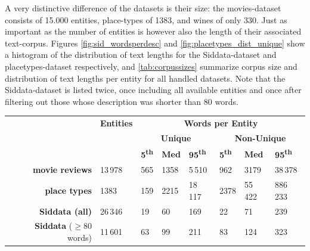 A very distinctive difference of the datasets is their size: the movies-dataset consists of 15.000 entities, place-types of 1383, and wines of only 330. Just as important as the number of entities is however also the length of their associated text-corpus. Figures \ref{fig:sid_wordsperdesc} and \ref{fig:placetypes_dist_unique} show a histogram of the distribution of text lengths for the Siddata-dataset and placetypes-dataset respectively, and \autoref{tab:corpussizes} summarize corpus size and distribution of text lengths per entity for all handled datasets. Note that the Siddata-dataset is listed twice, once including all available entities and once after filtering out those whose description was shorter than 80 words.

\begin{table}[H]
	\centering
	\begin{tabular}{r|l|lll|lll}
		&  \textbf{Entities}   & \multicolumn{6}{c}{\textbf{Words per Entity}}                                 \\
		&       & \multicolumn{3}{c}{\textbf{Unique}} & \multicolumn{3}{c}{\textbf{Non-Unique}} \\
	 &  & \textbf{5\textsuperscript{th}} & \textbf{Med} & \textbf{95\textsuperscript{th}} & \textbf{5\textsuperscript{th}} & \textbf{Med} & \textbf{95\textsuperscript{th}} \\ \midrule
	\textbf{movie reviews}             & 13\,978 & 565    & 1358 & 5\,510  & 962   & 3179    & 38\,378     \\
	\textbf{place types}               & 1383    & 159    & 2215 & 18\,117 & 2378  & 55\,422 & 886\,233    \\
	\textbf{Siddata (all)}    		   & 26\,346 & 19     & 60     & 169   & 22    & 71      & 239         \\
	\textbf{Siddata} ($\geq 80$ words) & 11\,601 & 63     & 99     & 211   & 83    & 124     & 323         
	\end{tabular}
	\label{tab:corpussizes}
\end{table}

